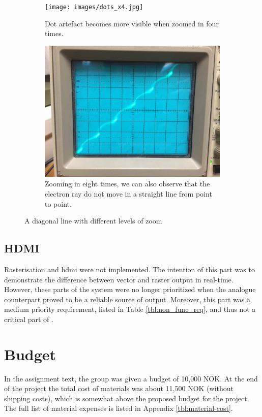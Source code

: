 \begin{figure}[h!]
	\ContinuedFloat
    \begin{subfigure}[b]{\textwidth}
		\centering
        \texttt{[image: images/dots\_x4.jpg]}
        \caption{Dot artefact becomes more visible when zoomed in four times.}
        \label{fig:dotx4}
    \end{subfigure}

    \begin{subfigure}[b]{\textwidth}
		\centering
        \includegraphics[height=0.4\textheight]{images/dots_x8.jpg}
        \caption{Zooming in eight times, we can also observe that the electron ray do not move in a straight line from point to point.}
        \label{fig:dotx8}
    \end{subfigure}
    \caption{A diagonal line with different levels of zoom}
    \label{fig:artefact-dots}
\end{figure}

\subsection{HDMI}
Rasterisation and \gls{hdmi} were not implemented.
The intention of this part was to demonstrate the difference between vector and raster output in real-time.
However, these parts of the system were no longer prioritized when the analogue counterpart proved to be a reliable source of output.
Moreover, this part was a medium priority requirement, listed in Table \ref{tbl:non_func_req}, and thus not a critical part of \vthreek.

\section{Budget}
In the assignment text, the group was given a budget of 10,000 NOK.
At the end of the project the total cost of materials was about 11,500 NOK (without shipping costs), which is somewhat above the proposed budget for the project.
The full list of material expenses is listed in Appendix \ref{tbl:material-cost}.
